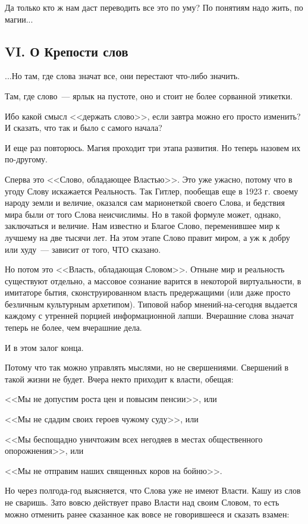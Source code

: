 \documentclass{scrbook}
\newcommand{\flqq}{<<}
\newcommand{\frqq}{>>}
\newcommand{\mdash}{~--- }
\newcommand{\essaysection}[1]{\subsection*{#1}\nopagebreak}
\begin{document}
Да только кто ж нам даст переводить все это по уму? По понятиям надо жить, по магии...

\essaysection{VI. О Крепости слов}

...Но там, где слова значат все, они перестают что-либо значить.

Там, где слово{\mdash}ярлык на пустоте, оно и стоит не более сорванной этикетки.

Ибо какой смысл {\flqq}держать слово{\frqq}, если завтра можно его просто изменить? И сказать, что так и было с самого начала?

И еще раз повторюсь. Магия проходит три этапа развития. Но теперь назовем их по-другому.

Сперва это {\flqq}Слово, обладающее Властью{\frqq}. Это уже ужасно, потому что в угоду Слову искажается Реальность. Так Гитлер, пообещав еще в 1923 г. своему народу земли и величие, оказался сам марионеткой своего Слова, и бедствия мира были от того Слова неисчислимы. Но в такой формуле может, однако, заключаться и величие. Нам известно и Благое Слово, переменившее мир к лучшему на две тысячи лет. На этом этапе Слово правит миром, а уж к добру или худу{\mdash}зависит от того, ЧТО сказано.

Но потом это {\flqq}Власть, обладающая Словом{\frqq}. Отныне мир и реальность существуют отдельно, а массовое сознание варится в некоторой виртуальности, в имитаторе бытия, сконструированном власть предержащими (или даже просто безличным культурным архетипом). Типовой набор мнений-на-сегодня выдается каждому с утренней порцией информационной лапши. Вчерашние слова значат теперь не более, чем вчерашние дела.

И в этом залог конца.

Потому что так можно управлять мыслями, но не свершениями. Свершений в такой жизни не будет. Вчера некто приходит к власти, обещая:

{\flqq}Мы не допустим роста цен и повысим пенсии{\frqq}, или

{\flqq}Мы не сдадим своих героев чужому суду{\frqq}, или

{\flqq}Мы беспощадно уничтожим всех негодяев в местах общественного опорожнения{\frqq}, или

{\flqq}Мы не отправим наших священных коров на бойню{\frqq}.

Но через полгода-год выясняется, что Слова уже не имеют Власти. Кашу из слов не сваришь. Зато вовсю действует право Власти над своим Словом, то есть можно отменить ранее сказанное как вовсе не говорившееся и сказать взамен:
\end{document}
